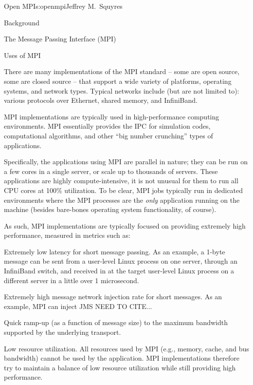 \begin{aosachapter}{Open MPI}{s:openmpi}{Jeffrey M.\ Squyres}
\begin{aosasect1}{Background}
\begin{aosasect2}{The Message Passing Interface (MPI)}
\end{aosasect2}


\begin{aosasect2}{Uses of MPI}

There are many implementations of the MPI standard -- some are open
source, some are closed source -- that support a wide variety of
platforms, operating systems, and network types.  
%
Typical networks include (but are not limited to): various protocols
over Ethernet, shared memory, and InfiniBand.

MPI implementations are typically used in high-performance computing
environments.  MPI essentially provides the IPC for simulation codes,
computational algorithms, and other ``big number crunching'' types of
applications.

Specifically, the applications using MPI are parallel in nature; they
can be run on a few cores in a single server, or scale up to thousands
of servers.  These applications are highly compute-intensive, it is
not unusual for them to run all CPU cores at 100\% utilization.  To be
clear, MPI jobs typically run in dedicated environments where the MPI
processes are the {\em only} application running on the machine
(besides bare-bones operating system functionality, of course).

As such, MPI implementations are typically focused on providing
extremely high performance, measured in metrics such as:

\begin{aosaitemize}
\item Extremely low latency for short message passing.  As an example,
  a 1-byte message can be sent from a user-level Linux process on one
  server, through an InfiniBand switch, and received in at the target
  user-level Linux process on a different server in a little over 1
  microsecond.
\item Extremely high message network injection rate for short
  messages.  As an example, MPI can inject JMS NEED TO CITE...
\item Quick ramp-up (as a function of message size) to the maximum
  bandwidth supported by the underlying transport.
\item Low resource utilization.  All resources used by MPI (e.g.,
  memory, cache, and bus bandwidth) cannot be used by the application.
  MPI implementations therefore try to maintain a balance of low
  resource utilization while still providing high performance.
\end{aosaitemize}


\end{aosasect2}
\end{aosasect1}
\end{aosachapter}
